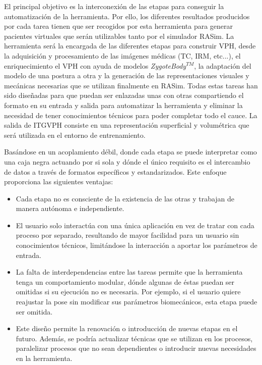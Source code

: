El principal objetivo es la interconexión de las etapas para conseguir la automatización de la herramienta. Por ello, los diferentes resultados producidos por cada tarea tienen que ser recogidos por esta herramienta para generar pacientes virtuales que serán utilizables tanto por el simulador \ac{RASim}. La herramienta será la encargada de las diferentes etapas para construir \ac{VPH}, desde la adquisición y procesamiento de las imágenes médicas (\ac{TC}, \ac{IRM}, etc...), el enriquecimiento el \ac{VPH} con ayuda de modelos \emph{ZygoteBody}$^{TM}$\cite{kelc2012zygote}, la adaptación del modelo de una postura a otra y la generación de las representaciones visuales y mecánicas necesarias que se utilizan finalmente en \ac{RASim}. Todas estas tareas han sido diseñadas para que puedan ser enlazadas unas con otras compartiendo el formato en su entrada y salida para automatizar la herramienta y eliminar la necesidad de tener conocimientos técnicos para poder completar todo el cauce. 
La salida de \ac{ITGVPH} consiste en una representación superficial y volumétrica que será utilizada en el entorno de entrenamiento.


Basándose en un acoplamiento débil, donde cada etapa se puede interpretar como una caja negra actuando por si sola y dónde el único requisito es el intercambio de datos a través de formatos específicos y estandarizados. Este enfoque proporciona las siguientes ventajas:
\begin{itemize}
    \item Cada etapa no es consciente de la existencia de las otras y trabajan de manera autónoma e independiente.
    
    \item El usuario solo interactúa con una única aplicación en vez de tratar con cada proceso por separado, resultando de mayor facilidad para un usuario sin conocimientos técnicos, limitándose la interacción a aportar los parámetros de entrada.  
    \item La falta de interdependencias entre las tareas permite que la herramienta tenga un comportamiento modular, dónde algunas de éstas puedan ser omitidas si su ejecución no es necesaria. Por ejemplo, si el usuario quiere reajustar la pose sin modificar sus parámetros biomecánicos, esta etapa puede ser omitida.
    
    \item Este diseño permite la renovación o introducción de nuevas etapas en el futuro. Además, se podría actualizar técnicas que se utilizan en los procesos, paralelizar procesos que no sean dependientes o introducir nuevas necesidades en la herramienta.
    
\end{itemize}

